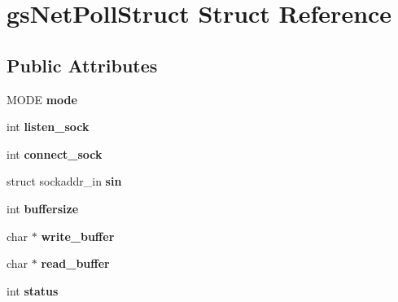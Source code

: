 \hypertarget{structgs_net_poll_struct}{}\section{gs\+Net\+Poll\+Struct Struct Reference}
\label{structgs_net_poll_struct}
\subsection*{Public Attributes}
\begin{DoxyCompactItemize}
\item 
\mbox{\label{structgs_net_poll_struct_a1be6792e67835c54accc08e8e45491e8}} 
M\+O\+DE {\bfseries mode}
\item 
\mbox{\label{structgs_net_poll_struct_aadd4971026545130c44002fff30c0ab3}} 
int {\bfseries listen\+\_\+sock}
\item 
\mbox{\label{structgs_net_poll_struct_a65ec43172028624e207f3f192359db7c}} 
int {\bfseries connect\+\_\+sock}
\item 
\mbox{\label{structgs_net_poll_struct_a027143e8c5c57fbfc6947a645e7f14c6}} 
struct sockaddr\+\_\+in {\bfseries sin}
\item 
\mbox{\label{structgs_net_poll_struct_ac0201ea7324c9ebc5f1467a71e1eac8c}} 
int {\bfseries buffersize}
\item 
\mbox{\label{structgs_net_poll_struct_ae69f1a660188359322676cee9878b3f8}} 
char $\ast$ {\bfseries write\+\_\+buffer}
\item 
\mbox{\label{structgs_net_poll_struct_aef9bdc8d9981903a4e7138983d11be39}} 
char $\ast$ {\bfseries read\+\_\+buffer}
\item 
\mbox{\label{structgs_net_poll_struct_a4b4794ce5a2d78fcfde30b6ee144ab98}} 
int {\bfseries status}
\item 
\mbox{\label{structgs_net_poll_struct_a1152f79228f062452b95108f232f3843}} 

\end{DoxyCompactItemize}
